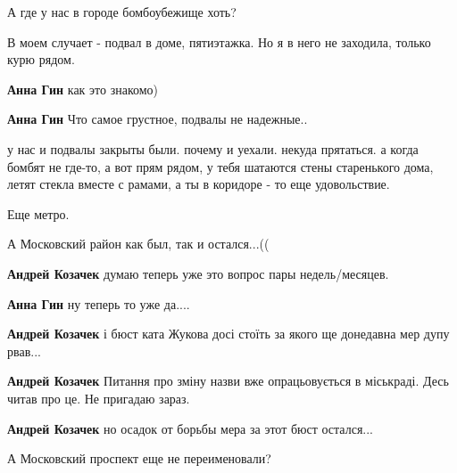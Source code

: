 
 
 
 
 
\zzSecCmt

\begin{itemize} %

А где у нас в городе бомбоубежище хоть?

\begin{itemize} %
В моем случает - подвал в доме, пятиэтажка. Но я в него не заходила, только курю рядом.

\textbf{Анна Гин} как это знакомо)

\textbf{Анна Гин} Что самое грустное, подвалы не надежные..


у нас и подвалы закрыты были. почему и уехали. некуда прятаться. а когда бомбят
не где-то, а вот прям рядом, у тебя шатаются стены старенького дома, летят
стекла вместе с рамами, а ты в коридоре - то еще удовольствие.

Еще метро.
\end{itemize} %

А Московский район как был, так и остался...((

\begin{itemize} %
\textbf{Андрей Козачек} думаю теперь уже это вопрос пары недель/месяцев.

\textbf{Анна Гин} ну теперь то уже да....

\textbf{Андрей Козачек} і бюст ката Жукова досі стоїть за якого ще донедавна мер дупу рвав...

\textbf{Андрей Козачек} Питання про зміну назви вже опрацьовується в міськраді. Десь читав про це. Не пригадаю зараз.

\textbf{Андрей Козачек} но осадок от борьбы мера за этот бюст остался...

А Московский проспект еще не переименовали?

\end{itemize} %


\end{itemize}
